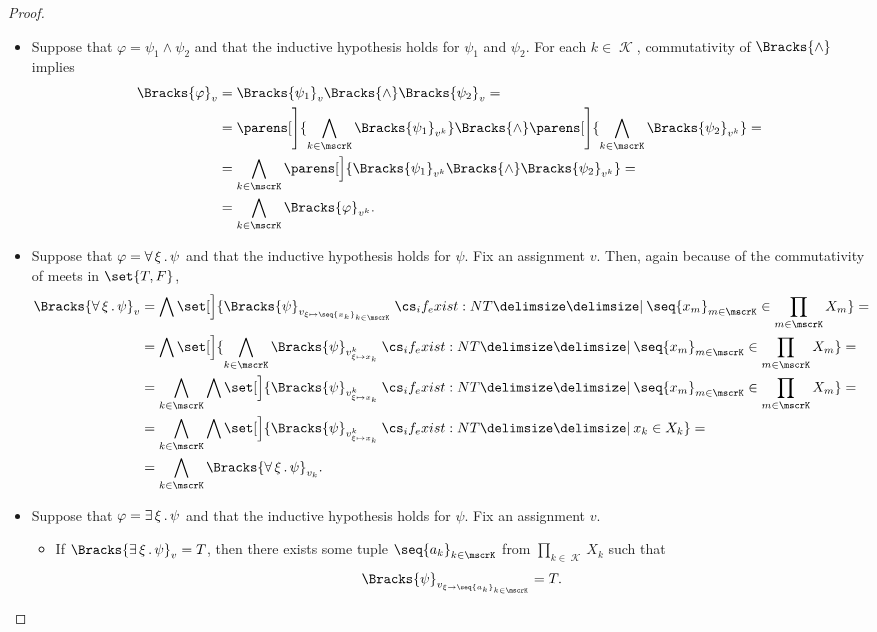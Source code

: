 \begin{proof}
\begin{itemize}
    \item Suppose that \( \varphi = \psi_1 \wedge \psi_2 \) and that the inductive hypothesis holds for \( \psi_1 \) and \( \psi_2 \). For each \( k \in \mscrK \), commutativity of \( \Bracks{\wedge} \) implies
    \begin{equation}\label{eq:thm:direct_product_preserves_positive_formulas/proof_conjunction}
      \begin{aligned}
        \Bracks{\varphi}_v
        &=
        \Bracks{\psi_1}_v \Bracks{\wedge} \Bracks{\psi_2}_v
        = \\ &=
        \parens[\Bigg]{ \bigwedge_{k \in \mscrK} \Bracks{\psi_1}_{v^k} } \Bracks{\wedge} \parens[\Bigg]{ \bigwedge_{k \in \mscrK} \Bracks{\psi_2}_{v^k} }
        = \\ &=
        \bigwedge_{k \in \mscrK} \parens[\Big]{ \Bracks{\psi_1}_{v^k} \Bracks{\wedge} \Bracks{\psi_2}_{v^k} }
        = \\ &=
        \bigwedge_{k \in \mscrK} \Bracks{\varphi}_{v^k}.
      \end{aligned}
    \end{equation}

    \item Suppose that \( \varphi = \forall \thinspace \xi \thinspace . \thinspace \psi \) and that the inductive hypothesis holds for \( \psi \). Fix an assignment \( v \). Then, again because of the commutativity of meets in \( \set{ T, F } \),
    \begin{align*}
      \Bracks{\qforall \xi \psi}_v
      &=
      \bigwedge \set[\Big]{ \Bracks{\psi}_{v_{\xi \mapsto \seq{ x_k }_{k \in \mscrK}}} \given* \seq{ x_m }_{m \in \mscrK} \in \prod_{m \in \mscrK} X_m }
      = \\ &=
      \bigwedge \set[\Big]{ \bigwedge_{k \in \mscrK} \Bracks{\psi}_{v^k_{\xi \mapsto x_k}} \given* \seq{ x_m }_{m \in \mscrK} \in \prod_{m \in \mscrK} X_m }
      = \\ &=
      \bigwedge_{k \in \mscrK} \bigwedge \set[\Big]{ \Bracks{\psi}_{v^k_{\xi \mapsto x_k}} \given* \seq{ x_m }_{m \in \mscrK} \in \prod_{m \in \mscrK} X_m }
      = \\ &=
      \bigwedge_{k \in \mscrK} \bigwedge \set[\Big]{ \Bracks{\psi}_{v^k_{\xi \mapsto x_k}} \given* x_k \in X_k }
      = \\ &=
      \bigwedge_{k \in \mscrK} \Bracks{\qforall \xi \psi}_{v_k}.
    \end{align*}

    \item Suppose that \( \varphi = \exists \thinspace \xi \thinspace . \thinspace \psi \) and that the inductive hypothesis holds for \( \psi \). Fix an assignment \( v \).
    \begin{itemize}
      \item If \( \Bracks{\qexists \xi \psi}_v = T \), then there exists some tuple \( \seq{ a_k }_{k \in \mscrK} \) from \( \prod_{k \in \mscrK} X_k \) such that
      \begin{equation*}
        \Bracks{\psi}_{v_{\xi \to \seq{ a_k }_{k \in \mscrK}}} = T.
      \end{equation*}


\end{itemize}
\end{itemize}
\end{proof}
